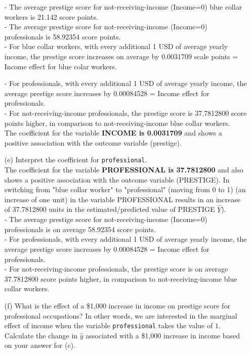 \documentclass[12pt,letterpaper]{article}
\begin{document}
\begin{enumerate}
- The average prestige score for not-receiving-income (Income=0) blue collar workers is 21.142 score points.\\
- The average prestige score for not-receiving-income (Income=0) professionals is 58.92354 score points.\\
- For blue collar workers, with every additional 1 USD of average yearly income, the  prestige score increases on average by 0.0031709 scale points = Income effect for blue colar workers.\\

\newpage

- For professionals, with every additional 1 USD of average yearly income, the average prestige score increases by 0.00084528 = Income effect for professionals.\\
- For not-receiving-income professionals, the prestige score is 37.7812800 score points higher, in comparison to not-receiving-income blue collar workers.\\


The coefficient for the variable \textbf{INCOME is 0.0031709} and shows a positive association with the outcome variable (prestige).
	

	\item [(e)]
	Interpret the coefficient for \texttt{professional}.\\
	
The coefficient for the variable \textbf{PROFESSIONAL is 37.7812800} and also shows a positive association with the outcome variable (PRESTIGE). In switching from "blue collar worker" to "professional" (moving from 0 to 1) (an increase of one unit) in the variable PROFESSIONAL results in an increase of 37.7812800 units in the estimated/predicted value of PRESTIGE $\hat{Y}$).\\

- The average prestige score for not-receiving-income (Income=0) professionals is on average 58.92354 score points.\\
- For professionals, with every additional 1 USD of average yearly income, the average prestige score increases by 0.00084528 = Income effect for professionals.\\
- For not-receiving-income professionals, the prestige score is on average 37.7812800 score points higher, in comparison to not-receiving-income blue collar workers.\\
	
	\item [(f)]
	What is the effect of a \$1,000 increase in income on prestige score for professional occupations? In other words, we are interested in the marginal effect of income when the variable \texttt{professional} takes the value of $1$. Calculate the change in $\hat{y}$ associated with a \$1,000 increase in income based on your answer for (c).\\
	

\end{enumerate}
\end{document}
